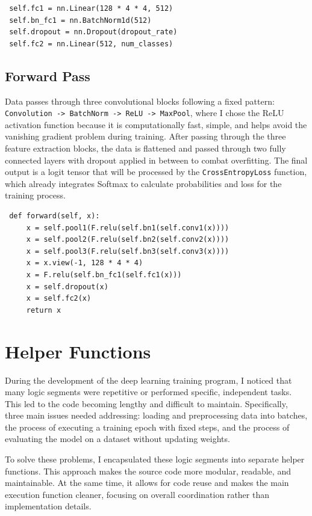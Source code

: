 \documentclass[12pt, a4paper, openany]{report}
\begin{document}
 \begin{verbatim}
 self.fc1 = nn.Linear(128 * 4 * 4, 512)
 self.bn_fc1 = nn.BatchNorm1d(512)
 self.dropout = nn.Dropout(dropout_rate)
 self.fc2 = nn.Linear(512, num_classes)
 \end{verbatim}

 \subsection{Forward Pass} %
 Data passes through three convolutional blocks following a fixed pattern: \texttt{Convolution -> BatchNorm -> ReLU -> MaxPool}, where I chose the ReLU activation function because it is computationally fast, simple, and helps avoid the vanishing gradient problem during training. After passing through the three feature extraction blocks, the data is flattened and passed through two fully connected layers with dropout applied in between to combat overfitting. The final output is a logit tensor that will be processed by the \texttt{CrossEntropyLoss} function, which already integrates Softmax to calculate probabilities and loss for the training process.

 \begin{verbatim}
 def forward(self, x):
     x = self.pool1(F.relu(self.bn1(self.conv1(x))))
     x = self.pool2(F.relu(self.bn2(self.conv2(x))))
     x = self.pool3(F.relu(self.bn3(self.conv3(x))))
     x = x.view(-1, 128 * 4 * 4)
     x = F.relu(self.bn_fc1(self.fc1(x)))
     x = self.dropout(x)
     x = self.fc2(x)
     return x
 \end{verbatim}

 \section{Helper Functions} %
 During the development of the deep learning training program, I noticed that many logic segments were repetitive or performed specific, independent tasks. This led to the code becoming lengthy and difficult to maintain. Specifically, three main issues needed addressing: loading and preprocessing data into batches, the process of executing a training epoch with fixed steps, and the process of evaluating the model on a dataset without updating weights.

 To solve these problems, I encapsulated these logic segments into separate helper functions. This approach makes the source code more modular, readable, and maintainable. At the same time, it allows for code reuse and makes the main execution function cleaner, focusing on overall coordination rather than implementation details.
\end{document}
